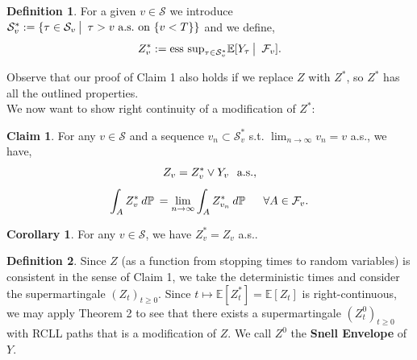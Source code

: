 \documentclass[12pt]{article}
\newcommand{\cF}{\mathcal{F}}
\newcommand{\cS}{\mathcal{S}}
\newcommand{\E}{\mathbb{E}}
\newcommand{\Prb}{\mathbb{P}}
\newcommand{\quantifyspace}{\hspace{2px} \big | \hspace{5px}}
\newcommand{\df}[1]{\hspace{2 px} d #1 \hspace{2 px}}
\newcommand{\spc}{\hspace{7 px}}
\newcommand{\sspc}{\hspace{3 px}}
\newcommand{\als}{\text{a.s.}}
\newcommand{\esssup}{\text{ess sup}}
\theoremstyle{definition}
\newtheorem{defn}{Definition}
\newtheorem{cor}{Corollary}
\newtheorem{claim}{Claim}
\begin{document}
\begin{defn}
    For a given $v \in \cS$ we introduce $\cS_v^* := \{\tau \in \cS_v \quantifyspace \tau > v \sspc \als \text{ on } \{v < T\} \}$ and we define,
    \[
        Z^*_v := \esssup_{\tau \in \cS_v^*} \E[Y_\tau \quantifyspace \cF_v].
    \]
\end{defn}
Observe that our proof of Claim 1 also holds if we replace $Z$ with $Z^*$, so $Z^*$ has all the outlined properties. \\
We now want to show right continuity of a modification of $Z^*$:
\begin{claim} \cite{karatzas1998}
    For any $v \in \cS$ and a sequence $v_n \subset \cS_v^*$ s.t. $\lim_{n \to \infty} v_n = v$ a.s., we have,
    \[
        Z_v = Z_v^* \vee Y_v \spc \als,
    \]
    \[
        \int_A Z_v^* \df{\Prb} = \lim_{n \to \infty} \int_A Z_{v_n}^* \df{\Prb} \spc \spc \forall A \in \cF_v.
    \]
\end{claim}

\begin{cor} \cite{karatzas1998}
    For any $v \in \cS$, we have $Z_v^* = Z_v$ a.s..
\end{cor}

\begin{defn}
    Since $Z$ (as a function from stopping times to random variables) is consistent in the sense of Claim 1, we take the deterministic times and consider the supermartingale $(Z_t)_{t \geq 0}$.
    Since $t \mapsto \E [Z_t^*] = \E[Z_t]$ is right-continuous, we may apply Theorem 2 to see that there exists a supermartingale $(Z^0_t)_{t \geq 0}$ with RCLL paths that is a modification of $Z$.
    We call $Z^0$ the \textbf{Snell Envelope} of $Y$.
\end{defn}
\end{document}
